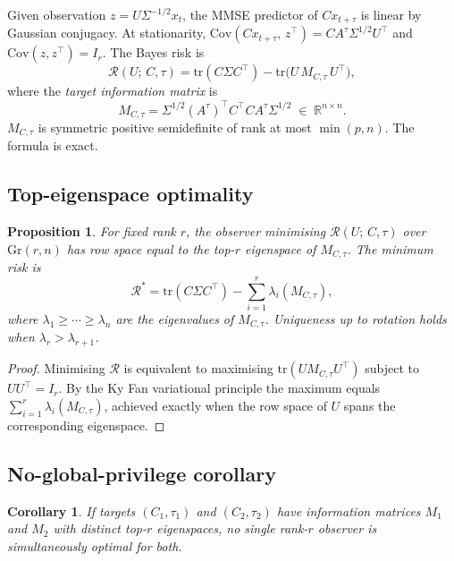 \documentclass[11pt]{article}
\newtheorem{proposition}[theorem]{Proposition}
\newtheorem{corollary}[theorem]{Corollary}
\newcommand{\Gr}{\mathrm{Gr}}
\newcommand{\tr}{\mathrm{tr}}
\newcommand{\R}{\mathbb{R}}
\begin{document}
Given observation $z = U \Sigma^{-1/2} x_t$, the MMSE predictor of
$Cx_{t+\tau}$ is linear by Gaussian conjugacy.
At stationarity,
$\mathrm{Cov}(Cx_{t+\tau},\,z^\top) = CA^\tau \Sigma^{1/2} U^\top$
and $\mathrm{Cov}(z,z^\top) = I_r$.
The Bayes risk is
\begin{equation}
  \mathcal{R}(U;\,C,\tau)
    = \tr(C\Sigma C^\top) - \tr\!\bigl(U\,M_{C,\tau}\,U^\top\bigr),
\end{equation}
where the \emph{target information matrix} is
\begin{equation}
  M_{C,\tau}
    = \Sigma^{1/2}(A^\tau)^\top C^\top C A^\tau \Sigma^{1/2}
    \;\in\; \R^{n\times n}.
\end{equation}
$M_{C,\tau}$ is symmetric positive semidefinite of rank at most $\min(p,n)$.
The formula is exact.

\subsection{Top-eigenspace optimality}

\begin{proposition}\label{prop:opt}
For fixed rank $r$, the observer minimising $\mathcal{R}(U;\,C,\tau)$ over
$\Gr(r,n)$ has row space equal to the top-$r$ eigenspace of $M_{C,\tau}$.
The minimum risk is
\begin{equation}
  \mathcal{R}^*
    = \tr(C\Sigma C^\top) - \sum_{i=1}^{r} \lambda_i(M_{C,\tau}),
\end{equation}
where $\lambda_1 \ge \cdots \ge \lambda_n$ are the eigenvalues of $M_{C,\tau}$.
Uniqueness up to rotation holds when $\lambda_r > \lambda_{r+1}$.
\end{proposition}

\begin{proof}
Minimising $\mathcal{R}$ is equivalent to maximising
$\tr(U M_{C,\tau} U^\top)$ subject to $UU^\top = I_r$.
By the Ky Fan variational principle the maximum equals
$\sum_{i=1}^r \lambda_i(M_{C,\tau})$, achieved exactly when the row space of
$U$ spans the corresponding eigenspace.
\end{proof}

\subsection{No-global-privilege corollary}

\begin{corollary}\label{cor:noglobal}
If targets $(C_1,\tau_1)$ and $(C_2,\tau_2)$ have information matrices
$M_1$ and $M_2$ with distinct top-$r$ eigenspaces, no single rank-$r$ observer
is simultaneously optimal for both.
\end{corollary}
\end{document}
